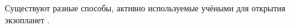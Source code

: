 \documentclass[14pt,a4paper]{extarticle}
\begin{document}
	Существуют разные способы, активно используемые учёными для открытия экзопланет \cite{methods}. %
	
	\vspace{5pt}
	
\end{document}
